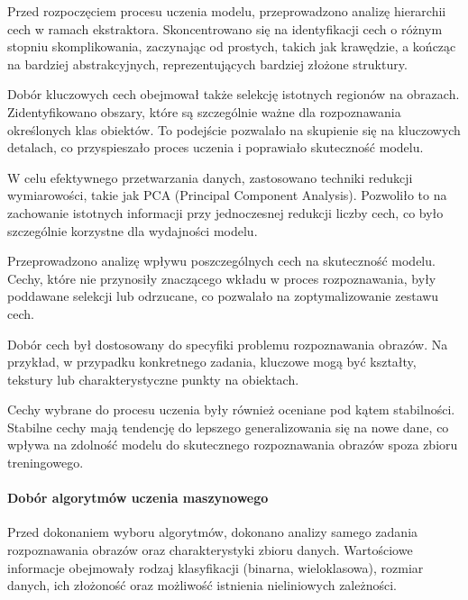 \documentclass[12pt, a4paper, twoside, openany]{book}
\newcommand{\forceindent}{\leavevmode{\parindent=1.3em\indent}}
\begin{document}
Przed rozpoczęciem procesu uczenia modelu, przeprowadzono analizę hierarchii cech w ramach ekstraktora.
Skoncentrowano się na identyfikacji cech o różnym stopniu skomplikowania, zaczynając od prostych, takich jak krawędzie, a kończąc na bardziej abstrakcyjnych, reprezentujących bardziej złożone struktury.

Dobór kluczowych cech obejmował także selekcję istotnych regionów na obrazach.
Zidentyfikowano obszary, które są szczególnie ważne dla rozpoznawania określonych klas obiektów.
To podejście pozwalało na skupienie się na kluczowych detalach, co przyspieszało proces uczenia i poprawiało skuteczność modelu.

W celu efektywnego przetwarzania danych, zastosowano techniki redukcji wymiarowości, takie jak PCA (Principal Component Analysis).
Pozwoliło to na zachowanie istotnych informacji przy jednoczesnej redukcji liczby cech, co było szczególnie korzystne dla wydajności modelu.

Przeprowadzono analizę wpływu poszczególnych cech na skuteczność modelu.
Cechy, które nie przynosiły znaczącego wkładu w proces rozpoznawania, były poddawane selekcji lub odrzucane, co pozwalało na zoptymalizowanie zestawu cech.

Dobór cech był dostosowany do specyfiki problemu rozpoznawania obrazów.
Na przykład, w przypadku konkretnego zadania, kluczowe mogą być kształty, tekstury lub charakterystyczne punkty na obiektach.

Cechy wybrane do procesu uczenia były również oceniane pod kątem stabilności. Stabilne cechy mają tendencję do lepszego generalizowania się na nowe dane, co wpływa na zdolność modelu do skutecznego rozpoznawania obrazów spoza zbioru treningowego.

\paragraph{Dobór algorytmów uczenia maszynowego\\}
\forceindent Przed dokonaniem wyboru algorytmów, dokonano analizy samego zadania rozpoznawania obrazów oraz charakterystyki zbioru danych.
Wartościowe informacje obejmowały rodzaj klasyfikacji (binarna, wieloklasowa), rozmiar danych, ich złożoność oraz możliwość istnienia nieliniowych zależności.
\end{document}

